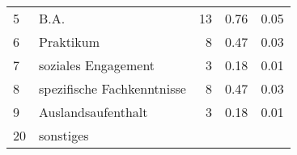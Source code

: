 \begin{longtable}{lXrrr}
     5 &
     \multicolumn{1}{X}{ B.A.   } &


       \num{13} &
       \num[round-mode=places,round-precision=2]{0,76} &
         \num[round-mode=places,round-precision=2]{0,05} \\

     6 &
     \multicolumn{1}{X}{ Praktikum   } &


       \num{8} &
       \num[round-mode=places,round-precision=2]{0,47} &
         \num[round-mode=places,round-precision=2]{0,03} \\

     7 &
     \multicolumn{1}{X}{ soziales Engagement   } &


       \num{3} &
       \num[round-mode=places,round-precision=2]{0,18} &
         \num[round-mode=places,round-precision=2]{0,01} \\

     8 &
     \multicolumn{1}{X}{ spezifische Fachkenntnisse   } &


       \num{8} &
       \num[round-mode=places,round-precision=2]{0,47} &
         \num[round-mode=places,round-precision=2]{0,03} \\

     9 &
     \multicolumn{1}{X}{ Auslandsaufenthalt   } &


       \num{3} &
       \num[round-mode=places,round-precision=2]{0,18} &
         \num[round-mode=places,round-precision=2]{0,01} \\

     20 &
     \multicolumn{1}{X}{ sonstiges   } &



\end{longtable}
